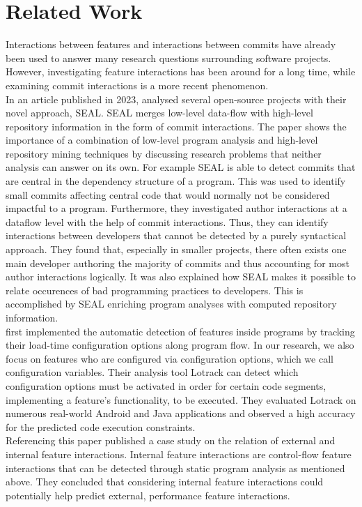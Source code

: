 \section{Related Work}\label{ch:related_work}

Interactions between features \cite{lillack2014tracking,kolesnikov2017relation} and interactions between commits \cite{sattler2023seal} have already been used to answer many research questions surrounding software projects.
However, investigating feature interactions has been around for a long time, while examining commit interactions is a more recent phenomenon. \\
In an article published in 2023, \citet{sattler2023seal} analysed several open-source projects with their novel approach, SEAL.
SEAL merges low-level data-flow with high-level repository information in the form of commit interactions.
The paper shows the importance of a combination of low-level program analysis and high-level repository mining techniques by discussing research problems that neither analysis can answer on its own.
For example SEAL is able to detect commits that are central in the dependency structure of a program\cite{sattler2023seal}.
This was used to identify small commits affecting central code that would normally not be considered impactful to a program.
Furthermore, they investigated author interactions at a dataflow level with the help of commit interactions.
Thus, they can identify interactions between developers that cannot be detected by a purely syntactical approach.
They found that, especially in smaller projects, there often exists one main developer authoring the majority of commits\cite{sattler2023seal} and thus accounting for most author interactions logically. 
It was also explained how SEAL makes it possible to relate occurences of bad programming practices to developers. 
This is accomplished by SEAL enriching program analyses with computed repository information. \\
\citet{lillack2014tracking} first implemented the automatic detection of features inside programs by tracking their load-time configuration options along program flow.
In our research, we also focus on features who are configured via configuration options, which we call configuration variables. 
Their analysis tool Lotrack can detect which configuration options must be activated in order for certain code segments, implementing a feature's functionality, to be executed.
They evaluated Lotrack on numerous real-world Android and Java applications and observed a high accuracy for the predicted code execution constraints\cite{lillack2014tracking}. \\
Referencing this paper \citet{kolesnikov2017relation} published a case study on the relation of external and internal feature interactions.
Internal feature interactions are control-flow feature interactions that can be detected through static program analysis as mentioned above.
They concluded that considering internal feature interactions could potentially help predict external, performance feature interactions\cite{kolesnikov2017relation}.
